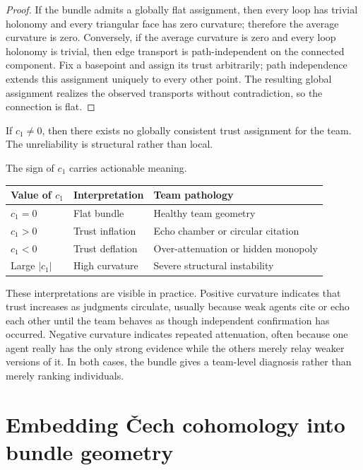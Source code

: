 \documentclass[11pt]{article}
\newcommand{\Chern}{c_1}
\begin{document}
\begin{proof}
If the bundle admits a globally flat assignment, then every loop has trivial
holonomy and every triangular face has zero curvature; therefore the average
curvature is zero.  Conversely, if the average curvature is zero and every loop
holonomy is trivial, then edge transport is path-independent on the connected
component.  Fix a basepoint and assign its trust arbitrarily; path independence
extends this assignment uniquely to every other point.  The resulting global
assignment realizes the observed transports without contradiction, so the
connection is flat.
\end{proof}

\begin{corollary}
If $\Chern \neq 0$, then there exists no globally consistent trust assignment for
the team.  The unreliability is structural rather than local.
\end{corollary}

The sign of $\Chern$ carries actionable meaning.
\begin{center}
\begin{tabular}{@{}lll@{}}
\toprule
Value of $\Chern$ & Interpretation & Team pathology \\
\midrule
$\Chern = 0$ & Flat bundle & Healthy team geometry \\
$\Chern > 0$ & Trust inflation & Echo chamber or circular citation \\
$\Chern < 0$ & Trust deflation & Over-attenuation or hidden monopoly \\
Large $|\Chern|$ & High curvature & Severe structural instability \\
\bottomrule
\end{tabular}
\end{center}

These interpretations are visible in practice.  Positive curvature indicates
that trust increases as judgments circulate, usually because weak agents cite or
echo each other until the team behaves as though independent confirmation has
occurred.  Negative curvature indicates repeated attenuation, often because one
agent really has the only strong evidence while the others merely relay weaker
versions of it.  In both cases, the bundle gives a team-level diagnosis rather
than merely ranking individuals.

\section{Embedding \v{C}ech cohomology into bundle geometry}\label{sec:cech-embedding}
\end{document}
